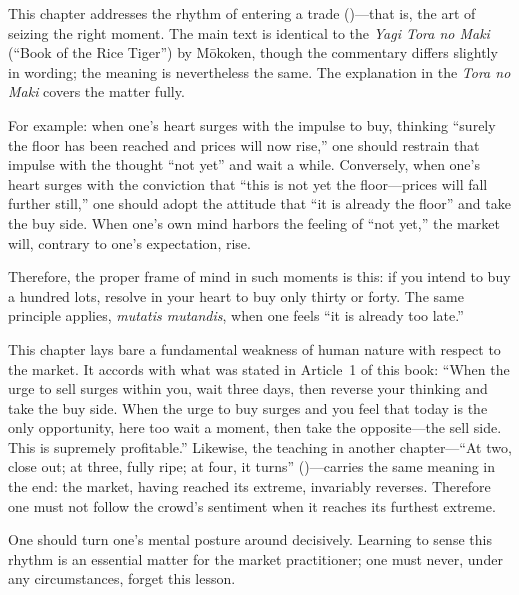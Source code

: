\commentary
This chapter addresses the rhythm of entering a trade ()---that
is, the art of seizing the right moment. The main text is identical to the
\textit{Yagi Tora no Maki} (``Book of the Rice Tiger'') by M\=okoken,
though the commentary differs slightly in wording; the meaning is
nevertheless the same. The explanation in the \textit{Tora no Maki} covers
the matter fully.

For example: when one's heart surges with the impulse to buy, thinking
``surely the floor has been reached and prices will now rise,'' one should
restrain that impulse with the thought ``not yet'' and wait a while.
Conversely, when one's heart surges with the conviction that ``this is not
yet the floor---prices will fall further still,'' one should adopt the
attitude that ``it is already the floor'' and take the buy side. When one's
own mind harbors the feeling of ``not yet,'' the market will, contrary to
one's expectation, rise.

Therefore, the proper frame of mind in such moments is this: if you intend
to buy a hundred lots, resolve in your heart to buy only thirty or forty.
The same principle applies, \textit{mutatis mutandis}, when one feels ``it
is already too late.''

This chapter lays bare a fundamental weakness of human nature with respect
to the market. It accords with what was stated in Article~1 of this book:
``When the urge to sell surges within you, wait three days, then reverse
your thinking and take the buy side. When the urge to buy surges and you
feel that today is the only opportunity, here too wait a moment, then take
the opposite---the sell side. This is supremely profitable.'' Likewise, the
teaching in another chapter---``At two, close out; at three, fully ripe; at
four, it turns'' ()---carries the same
meaning in the end: the market, having reached its extreme, invariably
reverses. Therefore one must not follow the crowd's sentiment when it
reaches its furthest extreme.

One should turn one's mental posture around decisively. Learning to sense
this rhythm is an essential matter for the market practitioner; one must
never, under any circumstances, forget this lesson.


